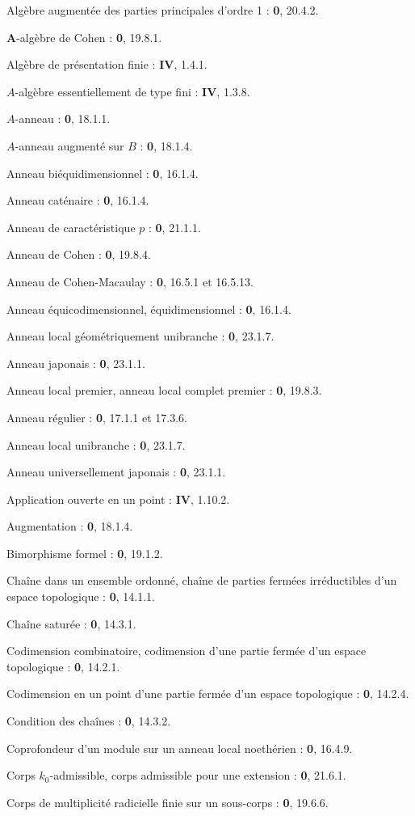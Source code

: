 Algèbre augmentée des parties principales d'ordre 1 : \textbf{0}, 20.4.2.\par
$\mathbf{A}$-algèbre de Cohen : \textbf{0}, 19.8.1.\par
Algèbre de présentation finie : \textbf{IV}, 1.4.1.\par
$A$-algèbre essentiellement de type fini : \textbf{IV}, 1.3.8.\par
$A$-anneau : \textbf{0}, 18.1.1.\par
$A$-anneau augmenté sur $B$ : \textbf{0}, 18.1.4.\par
Anneau biéquidimensionnel : \textbf{0}, 16.1.4.\par
Anneau caténaire : \textbf{0}, 16.1.4.\par
Anneau de caractéristique $p$ : \textbf{0}, 21.1.1.\par
Anneau de Cohen : \textbf{0}, 19.8.4.\par
Anneau de Cohen-Macaulay : \textbf{0}, 16.5.1 et 16.5.13.\par
Anneau équicodimensionnel, équidimensionnel : \textbf{0}, 16.1.4.\par
Anneau local géométriquement unibranche : \textbf{0}, 23.1.7.\par
Anneau japonais : \textbf{0}, 23.1.1.\par
Anneau local premier, anneau local complet premier : \textbf{0}, 19.8.3.\par
Anneau régulier : \textbf{0}, 17.1.1 et 17.3.6.\par
Anneau local unibranche : \textbf{0}, 23.1.7.\par
Anneau universellement japonais : \textbf{0}, 23.1.1.\par
Application ouverte en un point : \textbf{IV}, 1.10.2.\par
Augmentation : \textbf{0}, 18.1.4.\par

Bimorphisme formel : \textbf{0}, 19.1.2.\par

Chaîne dans un ensemble ordonné, chaîne de parties fermées irréductibles d'un espace topologique : \textbf{0}, 14.1.1.\par
Chaîne saturée : \textbf{0}, 14.3.1.\par
Codimension combinatoire, codimension d'une partie fermée d'un espace topologique : \textbf{0}, 14.2.1.\par
Codimension en un point d'une partie fermée d'un espace topologique : \textbf{0}, 14.2.4.\par
Condition des chaînes : \textbf{0}, 14.3.2.\par
Coprofondeur d'un module sur un anneau local noethérien : \textbf{0}, 16.4.9.\par
Corps $k_0$-admissible, corps admissible pour une extension : \textbf{0}, 21.6.1.\par
Corps de multiplicité radicielle finie sur un sous-corps : \textbf{0}, 19.6.6.\par


